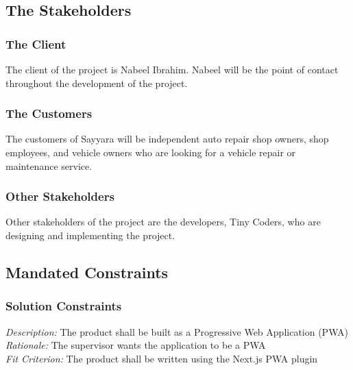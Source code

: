 \documentclass[12pt]{article}
\begin{document}
\subsection{The Stakeholders}

\subsubsection{The Client}
The client of the project is Nabeel Ibrahim. Nabeel will be the point of contact throughout the
development of the project.

\subsubsection{The Customers}
The customers of Sayyara will be independent auto repair shop owners, shop employees, and vehicle
owners who are looking for a vehicle repair or maintenance service.

\subsubsection{Other Stakeholders}
Other stakeholders of the project are the developers, Tiny Coders, who are designing and
implementing the project.

\subsection{Mandated Constraints}

\subsubsection{Solution Constraints}
\emph{Description:} The product shall be built as a Progressive Web Application (PWA)\\
\emph{Rationale:} The supervisor wants the application to be a PWA\\
\emph{Fit Criterion:} The product shall be written using the Next.js PWA plugin
\end{document}
